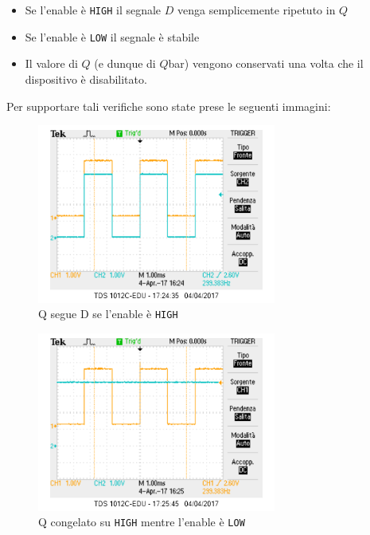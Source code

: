 \documentclass[a4paper,10pt]{article}
\def\code#1{\texttt{#1}}
\begin{document}
\begin{itemize}
\item Se l'enable è \code{HIGH} il segnale $D$ venga semplicemente ripetuto in $Q$
\item Se l'enable è \code{LOW} il segnale è stabile
\item Il valore di $Q$ (e dunque di $Q$bar) vengono conservati una volta che il dispositivo è disabilitato.
\end{itemize}

Per supportare tali verifiche sono state prese le seguenti immagini:


\begin{figure}[H]
	\centering
	\includegraphics[width=0.7\textwidth]{../grafici/enableUp.png}
	\caption{Q segue D se l'enable è \code{HIGH}}
	\label{fig:FFD}
\end{figure}

\begin{figure}[H]
	\centering
	\includegraphics[width=0.7\textwidth]{../grafici/EnableDown0.png}
	\caption{Q congelato su \code{HIGH} mentre l'enable è \code{LOW}}
	\label{fig:FFD}
\end{figure}
\end{document}
